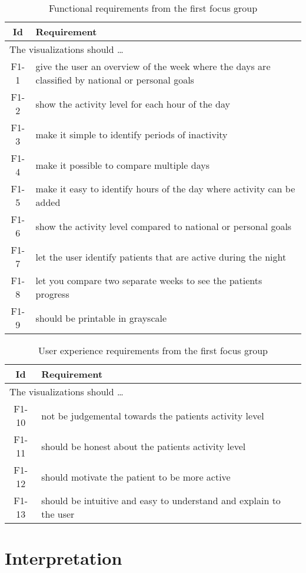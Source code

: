 \begin{table}[h!]
  \begin{center}
  \begin{tabular}{|c|p{12cm}|}
    \hline
      \textbf{Id} & \textbf{Requirement} \\ \hline
    \multicolumn{2}{|l|}{The visualizations should \ldots} \\ \hline
      F1-1 & give the user an overview of the week where the days are classified by national or personal goals \\ \hline
      F1-2 & show the activity level for each hour of the day \\ \hline
      F1-3 & make it simple to identify periods of inactivity \\ \hline
      F1-4 & make it possible to compare multiple days \\ \hline
      F1-5 & make it easy to identify hours of the day where activity can be added \\ \hline
      F1-6 & show the activity level compared to national or personal goals \\ \hline
      F1-7 & let the user identify patients that are active during the night \\ \hline
      F1-8 & let you compare two separate weeks to see the patients progress \\ \hline
      F1-9 & should be printable in grayscale \\ \hline
  \end{tabular}
  \end{center}
  \caption{Functional requirements from the first focus group}
\end{table}

\begin{table}[h!]
  \begin{center}
  \begin{tabular}{|c|p{12cm}|}
    \hline
      \textbf{Id} & \textbf{Requirement} \\ \hline
    \multicolumn{2}{|l|}{The visualizations should \ldots} \\ \hline
      F1-10 & not be judgemental towards the patients activity level \\ \hline
      F1-11 & should be honest about the patients activity level \\ \hline
      F1-12 & should motivate the patient to be more active \\ \hline
      F1-13 & should be intuitive and easy to understand and explain to the user \\ \hline
  \end{tabular}
  \end{center}
  \caption{User experience requirements from the first focus group}
\end{table}

\section{Interpretation}


